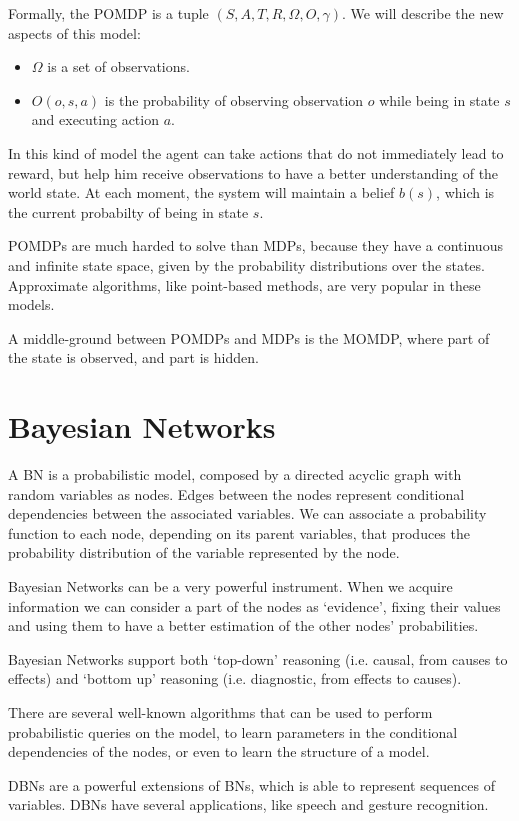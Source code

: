 Formally, the POMDP is a tuple $(S,A,T,R,\Omega,O,\gamma)$. We will describe the new aspects of this model:
\begin{itemize}
\item $\Omega$ is a set of observations.
\item $O(o,s,a)$ is the probability of observing observation $o$ while being in state $s$ and executing action $a$.
\end{itemize}

In this kind of model the agent can take actions that do not immediately lead to reward, but help him receive observations to have a better understanding of the world state. At each moment, the system will maintain a belief $b(s)$, which is the current probabilty of being in state $s$.

POMDPs are much harded to solve than MDPs, because they have a continuous and infinite state space, given by the probability distributions over the states. Approximate algorithms, like point-based methods, are very popular in these models.

A middle-ground between POMDPs and MDPs is the MOMDP, where part of the state is observed, and part is hidden.
\section{Bayesian Networks}
\label{sec:methods-bayesian_networks}

 A BN is a probabilistic model, composed by a directed acyclic graph with random variables as nodes. Edges between the nodes represent conditional dependencies between the associated variables. We can associate a probability function to each node, depending on its parent variables, that produces the probability distribution of the variable represented by the node. 

 Bayesian Networks can be a very powerful instrument. When we acquire information we can consider a part of the nodes as `evidence', fixing their values and using them to have a better estimation of the other nodes' probabilities. 

 Bayesian Networks support both `top-down' reasoning (i.e. causal, from causes to effects) and `bottom up' reasoning (i.e. diagnostic, from effects to causes).

There are several well-known algorithms that can be used to perform probabilistic queries on the model, to learn parameters in the conditional dependencies of the nodes, or even to learn the structure of a model.

DBNs are a powerful extensions of BNs, which is able to represent sequences of variables. DBNs have several applications, like speech and gesture recognition.